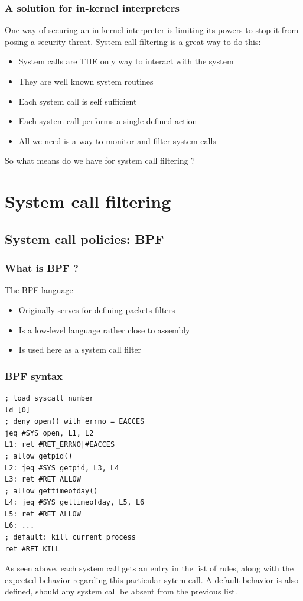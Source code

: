 \documentclass{beamer}
\begin{document}
\begin{frame}\frametitle{A solution for in-kernel interpreters}
One way of securing an in-kernel interpreter is limiting its powers to stop it from posing a security threat. System call filtering is a great way to do this:
\begin{itemize}[<+->]
	\item System calls are THE only way to interact with the system
	\item They are well known system routines
	\item Each system call is self sufficient
	\item Each system call performs a single defined action
	\item All we need is a way to monitor and filter system calls
 \end{itemize}
\pause
So what means do we have for system call filtering ?
\end{frame}

\section{System call filtering}

\subsection{System call policies: BPF}

\begin{frame}\frametitle{What is BPF ?}
The BPF language
\begin{itemize}[<+->]
	\item Originally serves for defining packets filters
	\item Is a low-level language rather close to assembly
	\item Is used here as a system call filter
 \end{itemize}
\end{frame}

\begin{frame}\frametitle{BPF syntax}
\begin{verbatim}
; load syscall number
ld [0]
; deny open() with errno = EACCES
jeq #SYS_open, L1, L2
L1: ret #RET_ERRNO|#EACCES
; allow getpid()
L2: jeq #SYS_getpid, L3, L4
L3: ret #RET_ALLOW
; allow gettimeofday()
L4: jeq #SYS_gettimeofday, L5, L6
L5: ret #RET_ALLOW
L6: ...
; default: kill current process
ret #RET_KILL
\end{verbatim}
\pause
As seen above, each system call gets an entry in the list of rules, along with the expected behavior regarding this particular sytem call. A default behavior is also defined, should any system call be absent from the previous list.
\end{frame}
\end{document}

